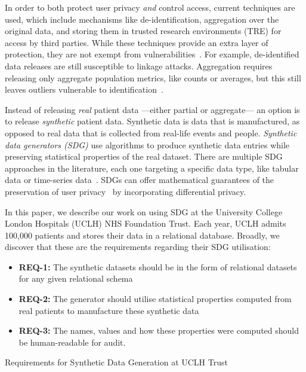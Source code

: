 \documentclass[11pt]{article}
\begin{document}
In order to both protect user privacy \emph{and} control access, current techniques are used, which include mechanisms like de-identification, aggregation over the original data, and storing them in trusted research environments (TRE) for access by third parties. While these techniques provide an extra layer of protection, they are not exempt from vulnerabilities~\cite{near2021}. For example, de-identified data releases are still susceptible to linkage attacks. Aggregation requires releasing only aggregate population metrics, like counts or averages, but this still leaves outliers vulnerable to identification~\cite{tucker2020}. 

Instead of releasing \emph{real} patient data ---either partial or aggregate--- an option is to release \emph{synthetic} patient data. Synthetic data is data that is manufactured, as opposed to real data that is collected from real-life events and people. 
\emph{Synthetic data generators (SDG)} use algorithms to produce synthetic data entries while preserving statistical properties of the real dataset.
There are multiple SDG approaches in the literature, each one targeting a specific data type, like tabular data or time-series data~\cite{DBLP:journals/corr/abs-2205-03257}.
SDGs can offer mathematical guarantees of the preservation of user privacy~\cite{Kopp2021MicrosoftSD, Cai2023} by incorporating differential privacy.

In this paper, we describe our work on using SDG at the University College London Hospitals (UCLH) NHS Foundation Trust.
Each year, UCLH admits 100,000 patients and stores their data in a relational database. Broadly, we discover that these are the requirements regarding their SDG utilisation:

\begin{listing}
\begin{itemize}
    \item \textbf{REQ-1:} The synthetic datasets should be in the form of relational datasets for any given relational schema
    \item \textbf{REQ-2:} The generator should utilise statistical properties computed from real patients to manufacture these synthetic data
    \item \textbf{REQ-3:} The names, values and how these properties were computed should be human-readable for audit. 
\end{itemize}
\caption{Requirements for Synthetic Data Generation at UCLH Trust}
\label{lst:UCLH Requirements}
\end{listing}
\end{document}

